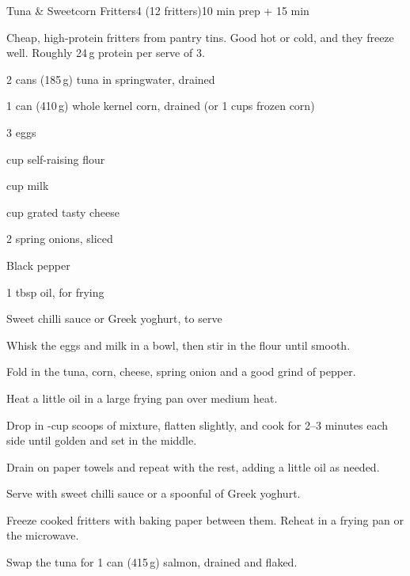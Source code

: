 \begin{recipebox}{Tuna \& Sweetcorn Fritters}{4 (12 fritters)}{10 min prep + 15 min}

Cheap, high-protein fritters from pantry tins. Good hot or cold, and they
freeze well. Roughly 24\,g protein per serve of 3.

\begin{ingredients}
  \item 2 cans (185\,g) tuna in springwater, drained
  \item 1 can (410\,g) whole kernel corn, drained (or 1 cups frozen corn)
  \item 3 eggs
  \item {} cup self-raising flour
  \item {} cup milk
  \item {} cup grated tasty cheese
  \item 2 spring onions, sliced
  \item Black pepper
  \item 1 tbsp oil, for frying
  \item Sweet chilli sauce or Greek yoghurt, to serve
\end{ingredients}

\begin{method}
  \item Whisk the eggs and milk in a bowl, then stir in the flour until smooth.
  \item Fold in the tuna, corn, cheese, spring onion and a good grind of pepper.
  \item Heat a little oil in a large frying pan over medium heat.
  \item Drop in -cup scoops of mixture, flatten slightly, and cook for 2--3 minutes each side until golden and set in the middle.
  \item Drain on paper towels and repeat with the rest, adding a little oil as needed.
  \item Serve with sweet chilli sauce or a spoonful of Greek yoghurt.
\end{method}

\begin{notelist}
  \item Freeze cooked fritters with baking paper between them. Reheat in a frying pan or the microwave.
  \item Swap the tuna for 1 can (415\,g) salmon, drained and flaked.
\end{notelist}

\end{recipebox}
